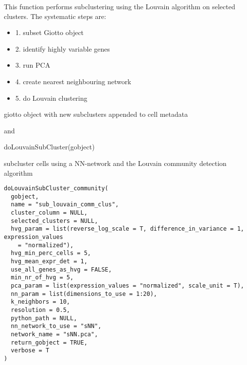 \documentclass[a4paper]{book}
\begin{document}
%
\begin{Details}\relax
This function performs subclustering using the Louvain algorithm on selected clusters.
The systematic steps are:
\begin{itemize}

\item{} 1. subset Giotto object
\item{} 2. identify highly variable genes
\item{} 3. run PCA
\item{} 4. create nearest neighbouring network
\item{} 5. do Louvain clustering

\end{itemize}

\end{Details}
%
\begin{Value}
giotto object with new subclusters appended to cell metadata
\end{Value}
%
\begin{SeeAlso}\relax
{} and 
\end{SeeAlso}
%
\begin{Examples}
\begin{ExampleCode}
    doLouvainSubCluster(gobject)
\end{ExampleCode}
\end{Examples}
%
\begin{Description}\relax
subcluster cells using a NN-network and the Louvain community detection algorithm
\end{Description}
%
\begin{Usage}
\begin{verbatim}
doLouvainSubCluster_community(
  gobject,
  name = "sub_louvain_comm_clus",
  cluster_column = NULL,
  selected_clusters = NULL,
  hvg_param = list(reverse_log_scale = T, difference_in_variance = 1, expression_values
    = "normalized"),
  hvg_min_perc_cells = 5,
  hvg_mean_expr_det = 1,
  use_all_genes_as_hvg = FALSE,
  min_nr_of_hvg = 5,
  pca_param = list(expression_values = "normalized", scale_unit = T),
  nn_param = list(dimensions_to_use = 1:20),
  k_neighbors = 10,
  resolution = 0.5,
  python_path = NULL,
  nn_network_to_use = "sNN",
  network_name = "sNN.pca",
  return_gobject = TRUE,
  verbose = T
)
\end{verbatim}
\end{Usage}
\end{document}
